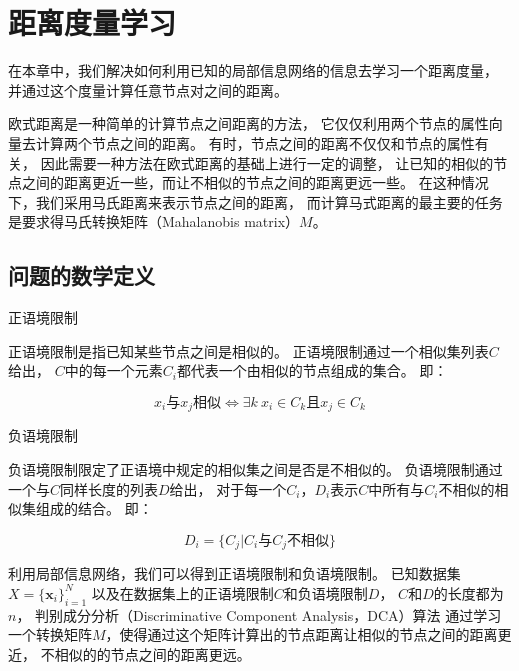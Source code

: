\chapter{距离度量学习}
\label{chap:dca}

在本章中，我们解决如何利用已知的局部信息网络的信息去学习一个距离度量，
并通过这个度量计算任意节点对之间的距离。

欧式距离是一种简单的计算节点之间距离的方法，
它仅仅利用两个节点的属性向量去计算两个节点之间的距离。
有时，节点之间的距离不仅仅和节点的属性有关，
因此需要一种方法在欧式距离的基础上进行一定的调整，
让已知的相似的节点之间的距离更近一些，而让不相似的节点之间的距离更远一些。
在这种情况下，我们采用马氏距离来表示节点之间的距离，
而计算马式距离的最主要的任务是要求得马氏转换矩阵（Mahalanobis matrix）$M$。

\section{问题的数学定义}
\label{sec:dcadef}

\begin{defn}{正语境限制}
\label{defn:posconstraints}

    正语境限制是指已知某些节点之间是相似的。
    正语境限制通过一个相似集列表$C$给出，
    $C$中的每一个元素$C_i$都代表一个由相似的节点组成的集合。
    即：

    $$
    x_i\text{与}x_j\text{相似} \Longleftrightarrow \exists k \ x_i \in C_k \text{且} x_j \in C_k 
    $$

\end{defn}

\begin{defn}{负语境限制}
\label{defn:negconstraints}

    负语境限制限定了正语境中规定的相似集之间是否是不相似的。
    负语境限制通过一个与$C$同样长度的列表$D$给出，
    对于每一个$C_i$，$D_i$表示$C$中所有与$C_i$不相似的相似集组成的结合。
    即：

    $$
    D_i = \{C_j | C_i \text{与} C_j \text{不相似} \}
    $$

\end{defn}

利用局部信息网络，我们可以得到正语境限制和负语境限制。
已知数据集
$X = \{ \bm{x}_i \}_{i=1}^{N}$
以及在数据集上的正语境限制$C$和负语境限制$D$，
$C$和$D$的长度都为$n$，
判别成分分析（Discriminative Component Analysis，DCA）算法
通过学习一个转换矩阵$M$，使得通过这个矩阵计算出的节点距离让相似的节点之间的距离更近，
不相似的的节点之间的距离更远。

